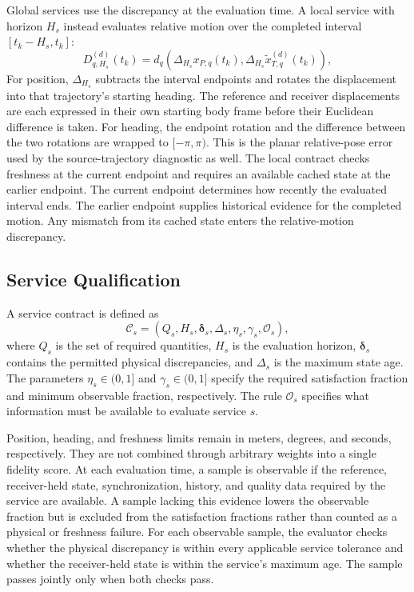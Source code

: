 \documentclass[journal]{IEEEtran}
\newcommand{\rev}[1]{#1}
\newcommand{\newrev}[1]{{#1}}
\begin{document}
Global services use the discrepancy at the evaluation time. A local service with horizon $H_s$ instead evaluates relative motion over the completed interval $[t_k-H_s,t_k]$:
\begin{equation}
D_{q,H_s}^{(d)}(t_k)
=
d_q\!\left(
\Delta_{H_s}x_{P,q}(t_k),
\Delta_{H_s}\widetilde{x}_{T,q}^{(d)}(t_k)
\right),
\end{equation}
\rev{For position, $\Delta_{H_s}$ subtracts the interval endpoints and
rotates the displacement into that trajectory's starting heading. The
reference and receiver displacements are each expressed in their own
starting body frame before their Euclidean difference is taken. For
heading, the endpoint rotation and the difference between the two
rotations are wrapped to $[-\pi,\pi)$. This is the planar relative-pose
error used by the source-trajectory diagnostic as well. The local
contract checks freshness at the current endpoint and requires an
available cached state at the earlier endpoint.}
\newrev{The current endpoint determines how recently the evaluated
interval ends. The earlier endpoint supplies historical evidence for
the completed motion. Any mismatch from its cached state enters the
relative-motion discrepancy.}

\subsection{Service Qualification}

A service contract is defined as
\begin{equation}
\mathcal{C}_s=
\left(
Q_s,H_s,\boldsymbol{\delta}_s,\Delta_s,
\eta_s,\gamma_s,\mathcal{O}_s
\right),
\end{equation}
where $Q_s$ is the set of required quantities, $H_s$ is the evaluation horizon, $\boldsymbol{\delta}_s$ contains the permitted physical discrepancies, and $\Delta_s$ is the maximum state age. The parameters $\eta_s\in(0,1]$ and $\gamma_s\in(0,1]$ specify the required satisfaction fraction and minimum observable fraction, respectively. The rule $\mathcal{O}_s$ specifies what information must be available to evaluate service \(s\).

Position, heading, and freshness limits remain in meters, degrees, and seconds, respectively. They are not combined through arbitrary weights into a single fidelity score.
At each evaluation time, a sample is observable if the reference,
receiver-held state, synchronization, history, and quality data required
by the service are available. A sample lacking this evidence lowers the
observable fraction but is excluded from the satisfaction fractions rather
than counted as a physical or freshness failure. For each observable
sample, the evaluator
checks whether the physical discrepancy is within every applicable
service tolerance and whether the receiver-held state is within the
service's maximum age. The sample passes jointly only when both checks
pass.
\end{document}
